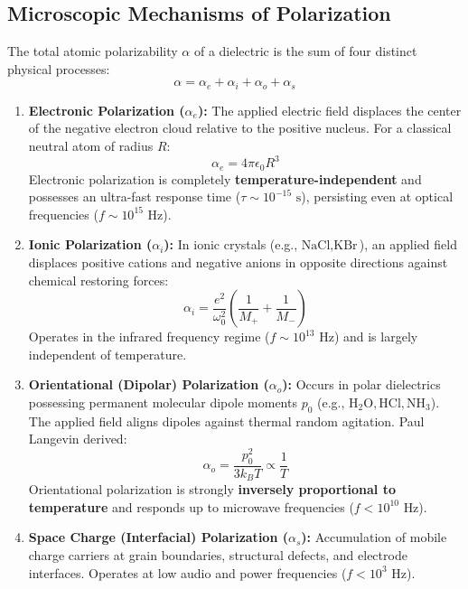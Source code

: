 \subsection{Microscopic Mechanisms of Polarization}
The total atomic polarizability $\alpha$ of a dielectric is the sum of four distinct physical processes:
\begin{equation}
\alpha = \alpha_e + \alpha_i + \alpha_o + \alpha_s
\end{equation}
\begin{enumerate}[leftmargin=*,itemsep=3pt]
    \item \textbf{Electronic Polarization ($\alpha_e$):} The applied electric field displaces the center of the negative electron cloud relative to the positive nucleus. For a classical neutral atom of radius $R$:
    \begin{equation}
    \alpha_e = 4\pi\epsilon_0 R^3
    \end{equation}
    Electronic polarization is completely \textbf{temperature-independent} and possesses an ultra-fast response time ($\tau \sim 10^{-15}\text{ s}$), persisting even at optical frequencies ($f \sim 10^{15}\text{ Hz}$).
    \item \textbf{Ionic Polarization ($\alpha_i$):} In ionic crystals (e.g., $\text{NaCl}, \text{KBr}$), an applied field displaces positive cations and negative anions in opposite directions against chemical restoring forces:
    \begin{equation}
    \alpha_i = \frac{e^2}{\omega_0^2}\left( \frac{1}{M_+} + \frac{1}{M_-} \right)
    \end{equation}
    Operates in the infrared frequency regime ($f \sim 10^{13}\text{ Hz}$) and is largely independent of temperature.
    \item \textbf{Orientational (Dipolar) Polarization ($\alpha_o$):} Occurs in polar dielectrics possessing permanent molecular dipole moments $p_0$ (e.g., $\text{H}_2\text{O}, \text{HCl}, \text{NH}_3$). The applied field aligns dipoles against thermal random agitation. Paul Langevin derived:
    \begin{equation}
    \alpha_o = \frac{p_0^2}{3 k_B T} \propto \frac{1}{T}
    \end{equation}
    Orientational polarization is strongly \textbf{inversely proportional to temperature} and responds up to microwave frequencies ($f < 10^{10}\text{ Hz}$).
    \item \textbf{Space Charge (Interfacial) Polarization ($\alpha_s$):} Accumulation of mobile charge carriers at grain boundaries, structural defects, and electrode interfaces. Operates at low audio and power frequencies ($f < 10^3\text{ Hz}$).
\end{enumerate}

